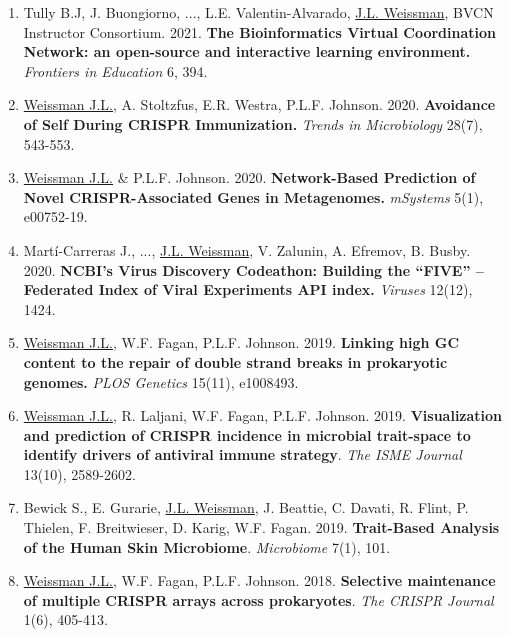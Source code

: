 \documentclass[]{res}
\begin{document}
\begin{resume}
\begin{enumerate}[leftmargin=*]
\item Tully B.J, J. Buongiorno, ..., L.E. Valentin-Alvarado, \underline{J.L. Weissman}, BVCN Instructor Consortium. 2021. {\bf The Bioinformatics Virtual Coordination Network: an open-source and interactive learning environment.} \emph{Frontiers in Education} 6, 394.

\item \underline{Weissman J.L.}, A. Stoltzfus, E.R. Westra, P.L.F. Johnson. 2020. {\bf Avoidance of Self During CRISPR Immunization.} \emph{Trends in Microbiology} 28(7), 543-553.

\item \underline{Weissman J.L.} \& P.L.F. Johnson. 2020. {\bf Network-Based Prediction of Novel CRISPR-Associated Genes in Metagenomes.} \emph{mSystems} 5(1), e00752-19.

\item Mart\'{i}-Carreras J., ..., \underline{J.L. Weissman}, V. Zalunin, A. Efremov, B. Busby. 2020. {\bf NCBI’s Virus Discovery Codeathon: Building the “FIVE” -- Federated Index of Viral Experiments API index.} \emph{Viruses} 12(12), 1424.
 
 \item \underline{Weissman J.L.}, W.F. Fagan, P.L.F. Johnson. 2019. {\bf Linking high GC content to the repair of double strand breaks in prokaryotic genomes.} \emph{PLOS Genetics} 15(11), e1008493.\\ %
 
 \item \underline{Weissman J.L.}, R. Laljani, W.F. Fagan, P.L.F. Johnson. 2019. {\bf Visualization and prediction of CRISPR incidence in microbial trait-space to identify drivers of antiviral immune strategy}. \emph{The ISME Journal} 13(10), 2589-2602. %
 
 \item Bewick S., E. Gurarie, \underline{J.L. Weissman}, J. Beattie, C. Davati, R. Flint, P. Thielen, F. Breitwieser, D. Karig, W.F. Fagan. 2019. {\bf Trait-Based Analysis of the Human Skin Microbiome}. \emph{Microbiome} 7(1), 101.  %

 \item \underline{Weissman J.L.}, W.F. Fagan, P.L.F. Johnson. 2018. {\bf Selective maintenance of multiple CRISPR arrays across prokaryotes}. \emph{The CRISPR Journal} 1(6), 405-413. %
 

\end{enumerate}
\end{resume}
\end{document}
